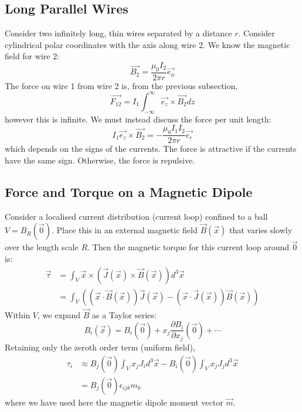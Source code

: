 \documentclass[../Main.tex]{subfiles}
\begin{document}
\subsection{Long Parallel Wires}
Consider two infinitely long, thin wires separated by a distance $r$. Consider cylindrical polar coordinates with the axis along wire 2. We know the magnetic field for wire 2:
\begin{equation*}
    \vec{B_2} = \frac{\mu_0 I_2}{2\pi r}\vec{e_\phi}
\end{equation*}
The force on wire 1 from wire 2 is, from the previous subsection,
\begin{equation*}
    \vec{F_{12}} = I_1 \int_{-\infty}^{\infty} \vec{e_z} \times \vec{B_2} dz 
\end{equation*}
however this is infinite. We must instead discuss the force per unit length:
\begin{equation*}
    I_1 \vec{e_z} \times \vec{B_2} = -\frac{\mu_0 I_1 I_2}{2\pi r} \vec{e_r}
\end{equation*}
which depends on the signs of the currents. The force is attractive if the currents have the same sign. Otherwise, the force is repulsive.
\subsection{Force and Torque on a Magnetic Dipole}
Consider a localised current distribution (current loop) confined to a ball $V = B_R(\vec0)$. Place this in an external magnetic field $\vec{B}(\vec{x})$ that varies slowly over the length scale $R$. Then the magnetic torque for this current loop around $\vec0$ is:
\begin{align*}
    \vec{\tau} &= \int_V \vec{x} \times (\vec{J}(\vec{x}) \times \vec{B}(\vec{x})) d^3 \vec{x} \\
    &= \int_V \left((\vec{x} \cdot \vec{B}(\vec{x}))\vec{J}(\vec{x}) - (\vec{x} \cdot \vec{J}(\vec{x}))\vec{B}(\vec{x})\right)
\end{align*}
Within $V$, we expand $\vec{B}$ as a Taylor series:
\begin{equation*}
    B_i(\vec{x}) = B_i(\vec0) + x_j \frac{\partial B_i}{\partial x_j} (\vec{0}) + \cdots
\end{equation*}
Retaining only the zeroth order term (uniform field),
\begin{align*}
    \tau_i &\approx B_j(\vec0) \int_V x_j J_i d^3\vec{x} - B_i(\vec0) \int_V x_j J_j d^3\vec{x} \\
    &= B_j(\vec0) \epsilon_{ijk} m_k
\end{align*}
where we have used here the magnetic dipole moment vector $\vec{m}$.
\end{document}
